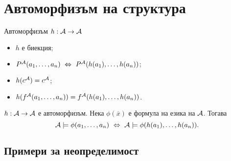 \section{Автоморфизъм на структура}

Автоморфизъм $h : \mathcal{A} \to \mathcal{A}$
\begin{itemize}
\item
  $h$ е биекция;
\item
  $P^{\mathcal{A}}(a_1,\dots,a_n) \ \Leftrightarrow\  P^{\mathcal{A}}(h(a_1),\dots,h(a_n))$;
\item
  $h(c^{\mathcal{A}}) = c^{\mathcal{A}}$;
\item
  $h(f^{\mathcal{A}}(a_1,\dots,a_n)) = f^{\mathcal{A}}(h(a_1),\dots,h(a_n))$.
\end{itemize}

\begin{theorem}\label{th:automorphism}
  $h:\mathcal{A}\to\mathcal{A}$ е автоморфизъм. Нека $\phi(\overline{x})$ е формула на езика на $\mathcal{A}$. Тогава
  \[\mathcal{A} \models \phi(a_1,\dots,a_n) \ \Leftrightarrow\  \mathcal{A} \models \phi(h(a_1),\dots,h(a_n)).\]
\end{theorem}

\subsection{Примери за неопределимост}

